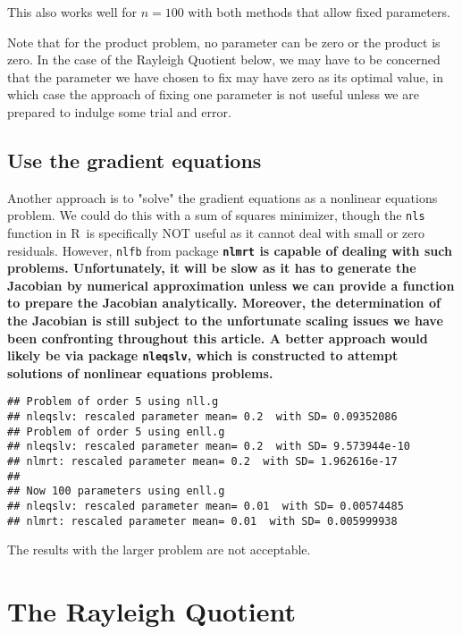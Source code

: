 \documentclass[11pt]{article}\usepackage[]{graphicx}\usepackage[]{color}
\makeatletter
\newenvironment{kframe}{%
 \def\at@end@of@kframe{}%
 \ifinner\ifhmode%
  \def\at@end@of@kframe{\end{minipage}}%
  \begin{minipage}{\columnwidth}%
 \fi\fi%
 \def\FrameCommand##1{\hskip\@totalleftmargin \hskip-\fboxsep
 \colorbox{shadecolor}{##1}\hskip-\fboxsep
     \hskip-\linewidth \hskip-\@totalleftmargin \hskip\columnwidth}%
 \MakeFramed {\advance\hsize-\width
   \@totalleftmargin\z@ \linewidth\hsize
   \@setminipage}}%
 {\par\unskip\endMakeFramed%
 \at@end@of@kframe}
\newenvironment{knitrout}{}{} %
\newcommand{\R}{{\sf R}}
\newcommand{\code}[1]{{\tt#1}}
\newcommand{\pkg}[1]{\bf{\tt#1}\rm }
\makeatother
\begin{document}
This also works well for $n=100$ with both methods that allow fixed parameters.

Note that for the product problem, no parameter can be zero or the product is zero.
In the case of the Rayleigh Quotient below, we may have to be concerned that the
parameter we have chosen to fix may have zero as its optimal value, in which case
the approach of fixing one parameter is not useful unless we are prepared to 
indulge some trial and error. 

\subsection{Use the gradient equations}

Another approach is to "solve" the gradient equations as a nonlinear equations
problem. We could do this with 
a sum of squares minimizer, though the \code{nls} function in \R\ is 
specifically NOT useful as it cannot deal
with small or zero residuals. However, \code{nlfb} 
from package \pkg{nlmrt} is capable of dealing
with such problems. Unfortunately, it will be slow as it has to 
generate the Jacobian by numerical
approximation unless we can provide a function to prepare the 
Jacobian analytically. Moreover,
the determination of the Jacobian is still subject to 
the unfortunate scaling issues we have
been confronting throughout this article. A better approach
would likely be via package \code{nleqslv}, which is constructed
to attempt solutions of nonlinear equations problems. 

\begin{knitrout}\scriptsize
{}\color{fgcolor}\begin{kframe}
\begin{verbatim}
## Problem of order 5 using nll.g
## nleqslv: rescaled parameter mean= 0.2  with SD= 0.09352086
## Problem of order 5 using enll.g
## nleqslv: rescaled parameter mean= 0.2  with SD= 9.573944e-10
## nlmrt: rescaled parameter mean= 0.2  with SD= 1.962616e-17
## 
## Now 100 parameters using enll.g
## nleqslv: rescaled parameter mean= 0.01  with SD= 0.00574485
## nlmrt: rescaled parameter mean= 0.01  with SD= 0.005999938
\end{verbatim}
\end{kframe}
\end{knitrout}

The results with the larger problem are not acceptable. 

\section{The Rayleigh Quotient}
\end{document}
